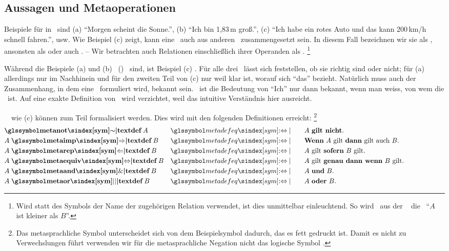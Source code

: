 \subsection{Aussagen und Metaoperationen}%
\label{sub:AussagenUndMetaoperationen}

Beispiele für  in \Metasprache\ sind
(a) \enquote{Morgen scheint die Sonne.},
(b) \enquote{Ich bin 1,83\,m groß.},
(c) \enquote{Ich habe ein rotes Auto und das kann 200\,km/h schnell fahren.}, usw.
Wie Beispiel (c) zeigt, kann eine \Aussage\ auch aus anderen \Aussagen\ zusammengesetzt sein.
In diesem Fall bezeichnen wir sie als , ansonsten als  oder auch .
-- Wir betrachten auch Relationen einschließlich ihrer Operanden als \Aussagen.%
\footnote{%
	Wird statt des Symbols der Name der zugehörigen Relation verwendet, ist dies unmittelbar einleuchtend.
	So wird \textzB\ aus der \Formel\  die \Aussage\ \enquote{$A$ ist kleiner als $B$}.
}

Während die Beispiele (a) und (b) \unzerlegbare\ (\atomare) \Aussagen\ sind, ist Beispiel (c) \zerlegbar.
Für alle drei \Aussagen\ lässt sich feststellen, ob sie richtig sind oder nicht;
für (a) allerdings nur im Nachhinein und für den zweiten Teil von (c) nur weil klar ist, worauf sich \enquote{das} bezieht.
Natürlich muss auch der Zusammenhang, in dem eine \Aussage\ formuliert wird, bekannt sein.
\textZB\ ist die Bedeutung von \enquote{Ich} nur dann bekannt, wenn man weiss, von wem die \Aussage\ ist.
Auf eine exakte Definition von \Aussage\ wird verzichtet, weil das intuitive Verständnis hier ausreicht.

\Zerlegbare\ \Aussagen\ wie (c) können zum Teil formalisiert werden.
Dies wird mit den folgenden Definitionen erreicht:%
\footnote{%
	Das metasprachliche Symbol \chrqt{\symmetanot} unterscheidet sich von dem Beispielsymbol \chrqt{\symrelbsp} dadurch, das es fett gedruckt ist.
	Damit es nicht zu Verwechslungen führt verwenden wir für die metasprachliche Negation nicht das logische Symbol \chrqt{\symlnot}.
}
\begin{align}
	&    \undefinition{\symmetanot}   A & \symmetadefeq \qquad &
	\text{$A$ \defn{gilt nicht}.}
	\\
	& A \bindefinition{\symmetaimp}   B & \symmetadefeq \qquad &
	\text{\defn{Wenn} $A$ gilt \defn{dann} gilt auch $B$.}
	\\
	& A \bindefinition{\symmetarep}   B & \symmetadefeq \qquad &
	\text{$A$ gilt \defn{sofern} $B$ gilt.}
	\\
	& A \bindefinition{\symmetaequiv} B & \symmetadefeq \qquad &
	\text{$A$ gilt \defn{genau dann wenn} $B$ gilt.}
	\\
	& A \bindefinition{\symmetaand}   B & \symmetadefeq \qquad &
	\text{$A$ \defn{und}  $B$.}
	\\
	& A \bindefinition{\symmetaor}    B & \symmetadefeq \qquad &
	\text{$A$ \defn{oder} $B$.}
	\formulatoleft
\end{align}

